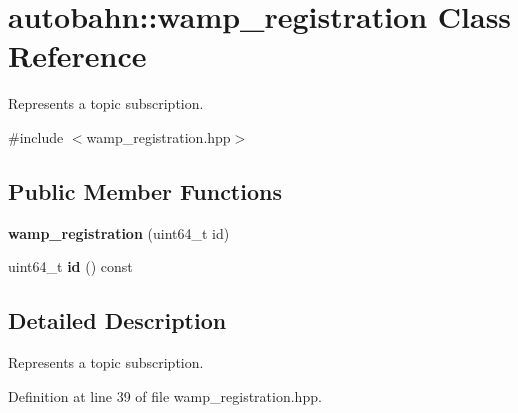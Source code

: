 \hypertarget{classautobahn_1_1wamp__registration}{}\section{autobahn\+:\+:wamp\+\_\+registration Class Reference}
\label{classautobahn_1_1wamp__registration}


Represents a topic subscription.  




{\ttfamily \#include $<$wamp\+\_\+registration.\+hpp$>$}

\subsection*{Public Member Functions}
\begin{DoxyCompactItemize}
\item 
{\bfseries wamp\+\_\+registration} (uint64\+\_\+t id)\hypertarget{classautobahn_1_1wamp__registration_aff6441843d9e47f493bb1fd6eee7d24b}{}\label{classautobahn_1_1wamp__registration_aff6441843d9e47f493bb1fd6eee7d24b}

\item 
uint64\+\_\+t {\bfseries id} () const \hypertarget{classautobahn_1_1wamp__registration_aa169a481a948af614f6846c4a7b3f3b0}{}\label{classautobahn_1_1wamp__registration_aa169a481a948af614f6846c4a7b3f3b0}

\end{DoxyCompactItemize}


\subsection{Detailed Description}
Represents a topic subscription. 

Definition at line 39 of file wamp\+\_\+registration.\+hpp.

